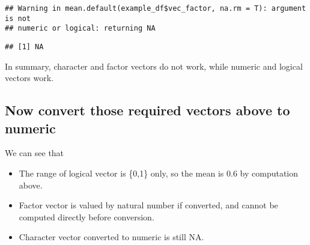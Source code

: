 \documentclass[
]{article}
\newenvironment{Shaded}{\begin{snugshade}}{\end{snugshade}}
\newcommand{\FunctionTok}[1]{\textcolor[rgb]{0.00,0.00,0.00}{#1}}
\newcommand{\NormalTok}[1]{#1}
\newcommand{\SpecialCharTok}[1]{\textcolor[rgb]{0.00,0.00,0.00}{#1}}
\providecommand{\tightlist}{%
  \setlength{\itemsep}{0pt}\setlength{\parskip}{0pt}}
\begin{document}
\begin{verbatim}
## Warning in mean.default(example_df$vec_factor, na.rm = T): argument is not
## numeric or logical: returning NA
\end{verbatim}

\begin{verbatim}
## [1] NA
\end{verbatim}

In summary, character and factor vectors do not work, while numeric and
logical vectors work.

\hypertarget{now-convert-those-required-vectors-above-to-numeric}{%
\subsection{Now convert those required vectors above to
numeric}\label{now-convert-those-required-vectors-above-to-numeric}}

\begin{Shaded}
\end{Shaded}

We can see that

\begin{itemize}
\tightlist
\item
  The range of logical vector is \{0,1\} only, so the mean is 0.6 by
  computation above.
\item
  Factor vector is valued by natural number if converted, and cannot be
  computed directly before conversion.
\item
  Character vector converted to numeric is still NA.
\end{itemize}
\end{document}
